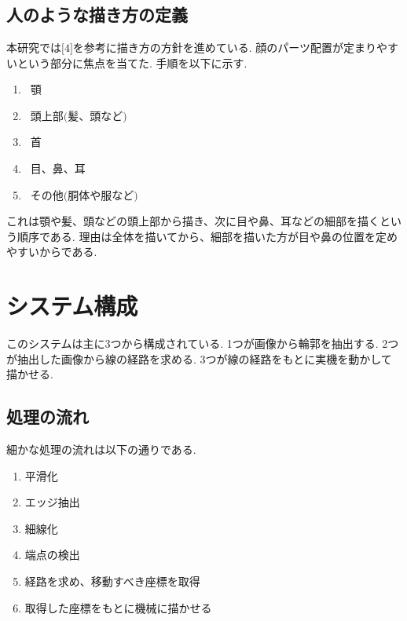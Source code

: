 \documentclass[a4j]{jarticle}			%
\begin{document}
\begin{multicols}{2} %

\section{}

\subsection{人のような描き方の定義}
本研究では$\lbrack4\rbrack$を参考に描き方の方針を進めている.
顔のパーツ配置が定まりやすいという部分に焦点を当てた.
手順を以下に示す.\\
\begin{enumerate}
	\setlength{\parskip}{0cm}
	\setlength{\itemsep}{0cm}
	\item \ 顎\\
	\item \ 頭上部$\lparen \text{髪、頭など} \rparen$\\
	\item \ 首 \\
	\item \ 目、鼻、耳\\
	\item \ その他$\lparen \text{胴体や服など} \rparen$ \\
\end{enumerate} 
これは顎や髪、頭などの頭上部から描き、次に目や鼻、耳などの細部を描くという順序である.
理由は全体を描いてから、細部を描いた方が目や鼻の位置を定めやすいからである.

\section{システム構成}
このシステムは主に3つから構成されている. 
1つが画像から輪郭を抽出する.
2つが抽出した画像から線の経路を求める.
3つが線の経路をもとに実機を動かして描かせる.

\subsection{処理の流れ}
細かな処理の流れは以下の通りである.\\ 
\begin{enumerate}
	\setlength{\parskip}{0cm} %
	\setlength{\itemsep}{0cm} %
	\item 平滑化\\
	\item エッジ抽出\\
	\item 細線化\\
	\item 端点の検出\\
	\item 経路を求め、移動すべき座標を取得\\
	\item 取得した座標をもとに機械に描かせる\\
\end{enumerate}


\end{multicols}
\end{document}
